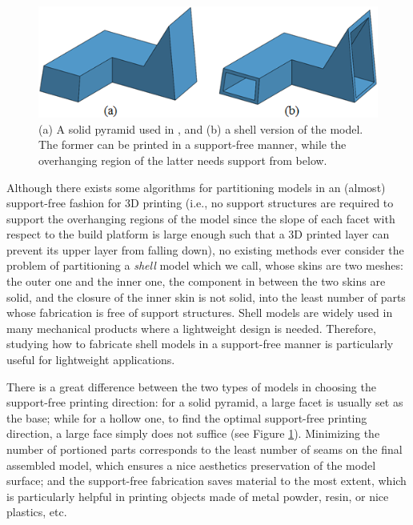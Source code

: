 \begin{figure}[t!]
  \centering
  \includegraphics[width=\linewidth]{figs/solid_hollow.png}
  \caption{\label{fig:solid_hollow}%
  (a) A solid pyramid used in \cite{Hu_siga14}, and (b) a shell version of the model. The former can be printed in a support-free manner, while {\color{red}the overhanging region} of the latter needs support from below.}
\end{figure}

{{Although there exists some algorithms for partitioning models in an (almost) support-free fashion \cite{Hu_siga14} for 3D printing ({\color{red}i.e., no support structures are required to support the overhanging regions of the model since the slope of each facet with respect to the build platform is large enough such that a 3D printed layer can prevent its upper layer from falling down}), no existing methods ever consider the problem of partitioning a \emph{shell} model which we call, {\color{red} whose skins are two meshes: the outer one and the inner one, the component in between the two skins are solid, and the closure of the inner skin is not solid}, into the least number of parts whose fabrication is free of support structures. { {Shell models are widely used in many mechanical products where a lightweight design is needed. Therefore, studying how to fabricate shell models in a support-free manner is particularly useful for lightweight applications.}}



There is a great difference between the two types of models in choosing the support-free printing direction: for a solid pyramid, a large facet is usually set as the base; while for a hollow one, to find the optimal support-free printing direction, a large face simply does not suffice (see Figure \ref{fig:solid_hollow}). Minimizing the number of portioned parts corresponds to the least number of seams on the final assembled model, which ensures a nice aesthetics preservation of the model surface; and the support-free fabrication saves material to the most extent, which is particularly helpful in printing objects made of metal powder, resin, or nice plastics, etc.}}



